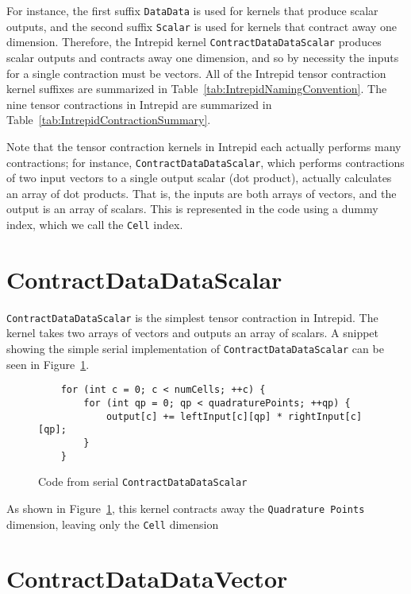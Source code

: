 For instance, the first suffix \texttt{DataData} is used for kernels that
produce scalar outputs, and the second suffix \texttt{Scalar} is used for
kernels that contract away one dimension.  Therefore, the Intrepid kernel
\texttt{ContractDataDataScalar} produces scalar outputs and contracts away one
dimension, and so by necessity the inputs for a single contraction must be
vectors.  All of the Intrepid tensor contraction kernel suffixes are summarized
in Table~\ref{tab:IntrepidNamingConvention}.  The nine tensor contractions in
Intrepid are summarized in Table~\ref{tab:IntrepidContractionSummary}.

Note that the tensor contraction kernels in Intrepid each actually performs many
contractions; for instance, \texttt{ContractDataDataScalar}, which performs
contractions of two input vectors to a single output scalar (dot product),
actually calculates an array of dot products.  That is, the inputs are both
arrays of vectors, and the output is an array of scalars.  This is represented
in the code using a dummy index, which we call the \texttt{Cell} index.

\section{ContractDataDataScalar}
\texttt{ContractDataDataScalar} is the simplest tensor contraction in Intrepid.
The kernel takes two arrays of vectors and outputs an array of scalars. A
snippet showing the simple serial implementation of
\texttt{ContractDataDataScalar} can be seen in
Figure~\ref{lst:ContractDataDataScalarSerial}.

\begin{figure}[ht]
    \begin{lstlisting}
    for (int c = 0; c < numCells; ++c) {
        for (int qp = 0; qp < quadraturePoints; ++qp) {
            output[c] += leftInput[c][qp] * rightInput[c][qp];
        }
    }
    \end{lstlisting}
\caption{Code from serial \texttt{ContractDataDataScalar}
\label{lst:ContractDataDataScalarSerial}} 
\end{figure}

As shown in 
Figure~\ref{lst:ContractDataDataScalarSerial}, this kernel contracts away the
\texttt{Quadrature Points} dimension, leaving only the \texttt{Cell} dimension 

\section{ContractDataDataVector}

